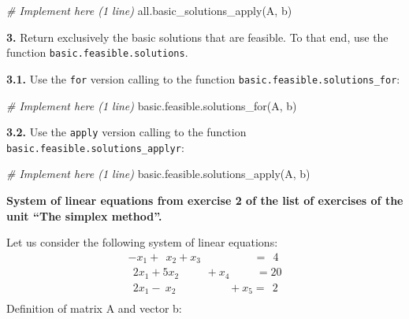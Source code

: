 \documentclass[
]{article}
\newenvironment{Shaded}{\begin{snugshade}}{\end{snugshade}}
\newcommand{\CommentTok}[1]{\textcolor[rgb]{0.56,0.35,0.01}{\textit{#1}}}
\newcommand{\FunctionTok}[1]{\textcolor[rgb]{0.00,0.00,0.00}{#1}}
\newcommand{\NormalTok}[1]{#1}
\begin{document}
\begin{Shaded}
\begin{Highlighting}[]
\CommentTok{\# Implement here (1 line)}
\FunctionTok{all.basic\_solutions\_apply}\NormalTok{(A, b)}
\end{Highlighting}
\end{Shaded}

\textbf{3.} Return exclusively the basic solutions that are feasible. To
that end, use the function \texttt{basic.feasible.solutions}.

\textbf{3.1.} Use the \texttt{for} version calling to the function
\texttt{basic.feasible.solutions\_for}:

\begin{Shaded}
\begin{Highlighting}[]
\CommentTok{\# Implement here (1 line)}
\FunctionTok{basic.feasible.solutions\_for}\NormalTok{(A, b)}
\end{Highlighting}
\end{Shaded}

\textbf{3.2.} Use the \texttt{apply} version calling to the function
\texttt{basic.feasible.solutions\_applyr}:

\begin{Shaded}
\begin{Highlighting}[]
\CommentTok{\# Implement here (1 line)}
\FunctionTok{basic.feasible.solutions\_apply}\NormalTok{(A, b)}
\end{Highlighting}
\end{Shaded}

\textbf{System of linear equations from exercise 2 of the list of
exercises of the unit ``The simplex method''.}

Let us consider the following system of linear equations: \[
\begin{array}{l}
      -x_{1}+\ \ x_{2}+x_3 \hspace{2cm}= \ \ 4    \\
      \ \ 2x_{1}+5x_{2} \hspace{1cm}+x_{4}\hspace{1cm}=20 \\
      \ \ 2x_{1}-\ x_{2}\hspace{2cm}+x_{5}=\ \ 2 \\
      \end{array}
\] Definition of matrix A and vector b:
\end{document}
